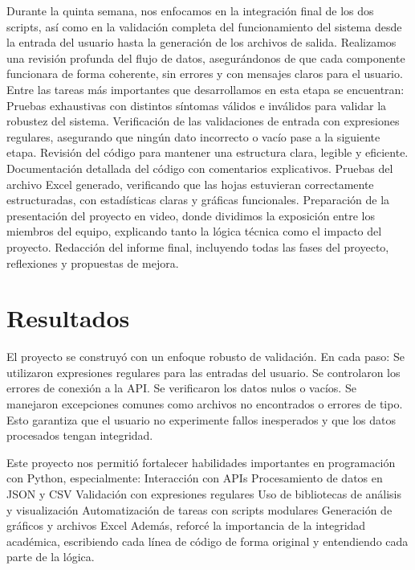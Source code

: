 \documentclass[11pt,letterpaper]{article}
\begin{document}
Durante la quinta semana, nos enfocamos en la integración final de los dos scripts, así como en la validación completa del funcionamiento del sistema desde la entrada del usuario hasta la generación de los archivos de salida. Realizamos una revisión profunda del flujo de datos, asegurándonos de que cada componente funcionara de forma coherente, sin errores y con mensajes claros para el usuario.
Entre las tareas más importantes que desarrollamos en esta etapa se encuentran:
Pruebas exhaustivas con distintos síntomas válidos e inválidos para validar la robustez del sistema.
Verificación de las validaciones de entrada con expresiones regulares, asegurando que ningún dato incorrecto o vacío pase a la siguiente etapa.
Revisión del código para mantener una estructura clara, legible y eficiente.
Documentación detallada del código con comentarios explicativos.
Pruebas del archivo Excel generado, verificando que las hojas estuvieran correctamente estructuradas, con estadísticas claras y gráficas funcionales.
Preparación de la presentación del proyecto en video, donde dividimos la exposición entre los miembros del equipo, explicando tanto la lógica técnica como el impacto del proyecto.
Redacción del informe final, incluyendo todas las fases del proyecto, reflexiones y propuestas de mejora.
\lipsum[3-6] 


\section*{Resultados}
El proyecto se construyó con un enfoque robusto de validación. En cada paso:
Se utilizaron expresiones regulares para las entradas del usuario.
Se controlaron los errores de conexión a la API.
Se verificaron los datos nulos o vacíos.
Se manejaron excepciones comunes como archivos no encontrados o errores de tipo.
Esto garantiza que el usuario no experimente fallos inesperados y que los datos procesados tengan integridad.

Este proyecto nos permitió fortalecer habilidades importantes en programación con Python, especialmente:
Interacción con APIs
Procesamiento de datos en JSON y CSV
Validación con expresiones regulares
Uso de bibliotecas de análisis y visualización
Automatización de tareas con scripts modulares
Generación de gráficos y archivos Excel
Además, reforcé la importancia de la integridad académica, escribiendo cada línea de código de forma original y entendiendo cada parte de la lógica.
\end{document}
